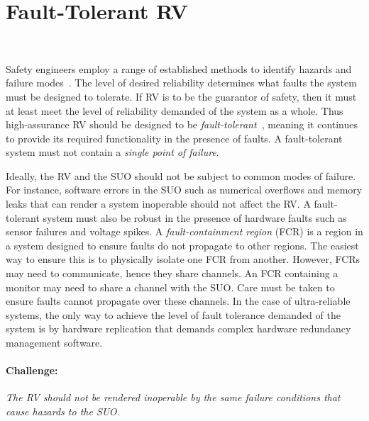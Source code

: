 \section{Fault-Tolerant RV}~\label{sec:ft}

 
Safety engineers employ a range of established methods to identify
hazards and failure modes~\cite{SAE4761}.  The level of desired
reliability determines what faults the system must be designed to
tolerate. If RV is to be the guarantor of safety, then it must at
least meet the level of reliability demanded of the system as a whole.
Thus high-assurance RV should  be designed to be
\emph{fault-tolerant}~\cite{butler-faults}, meaning it continues
to provide its required functionality in the presence of faults.  A
fault-tolerant system must not contain a \emph{single point of
  failure}.

 Ideally, the RV and the SUO should not be subject to common
 modes of failure.  For instance, software errors in the SUO such as
 numerical overflows and memory leaks that can render a system
 inoperable should not affect the RV.  A fault-tolerant system must
 also be robust in the presence of hardware faults such as sensor failures
 and voltage spikes.  A \emph{fault-containment region} (FCR)
 is a region in a system designed to ensure faults do not propagate to
 other regions.  The 
 easiest way to ensure this is to physically isolate one FCR from
 another.  However, FCRs may need to communicate, hence they share
 channels. An FCR containing a monitor may need to share a channel
 with the SUO.  Care must be taken to ensure faults cannot propagate
 over these channels. In the case of ultra-reliable systems, the only
 way to achieve the level of fault tolerance demanded of the system is
 by hardware replication that demands complex hardware redundancy
 management software. 


\paragraph{Challenge:}   \emph{The RV  should not be rendered inoperable by the
 same failure conditions that cause hazards to the SUO.}


